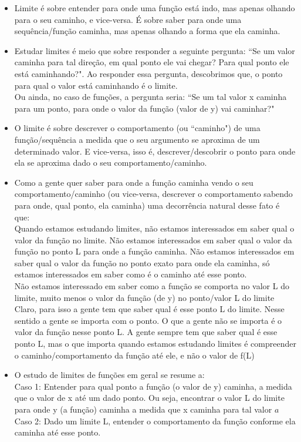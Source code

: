 \documentclass{article}
\begin{document}
\begin{itemize}
    \item Limite é sobre entender para onde uma função está indo, mas apenas olhando para o seu caminho, e vice-versa. É sobre saber para onde uma sequência/função caminha, mas apenas olhando a forma que ela caminha.

    \item Estudar limites é meio que sobre responder a seguinte pergunta: ``Se um valor caminha para tal direção, em qual ponto ele vai chegar? Para qual ponto ele está caminhando?". Ao responder essa pergunta, descobrimos que, o ponto para qual o valor está caminhando é o limite.
    \\[2pt]
    Ou ainda, no caso de funções, a pergunta seria: ``Se um tal valor x caminha para um ponto,  para onde o valor da função (valor de y) vai caminhar?"

    \item O limite é sobre descrever o comportamento (ou ``caminho") de uma função/sequência a medida que o seu argumento se aproxima de um determinado valor. E vice-versa, isso é, descrever/descobrir o ponto para onde ela se aproxima dado o seu comportamento/caminho.

    \item Como a gente quer saber para onde a função caminha vendo o seu comportamento/caminho (ou vice-versa, descrever o comportamento sabendo para onde, qual ponto, ela caminha) uma decorrência natural desse fato é que: 
    \\[2pt]
    Quando estamos estudando limites, não estamos interessados em saber qual o valor da função no limite. Não estamos interessados em saber qual o valor da função no ponto L para onde a função caminha. Não estamos interessados em saber qual o valor da função no ponto exato para onde ela caminha, só estamos interessados em saber como é o caminho até esse ponto.
    \\[2pt]
    Não estamos interessado em saber como a função se comporta no valor L do limite, muito menos o valor da função (de y) no ponto/valor L do limite
    \\[2pt]
    Claro, para isso a gente tem que saber qual é esse ponto L do limite. Nesse sentido a gente se importa com o ponto. O que a gente não se importa é o valor da função nesse ponto L. A gente sempre tem que saber qual é esse ponto L, mas o que importa quando estamos estudando limites é compreender o caminho/comportamento da função até ele, e não o valor de f(L)

    \item O estudo de limites de funções em geral se resume a: 
    \\[2pt]
    Caso 1: Entender para qual ponto a função (o valor de y) caminha, a medida que o valor de x até um dado ponto. Ou seja, encontrar o valor L do limite para onde y (a função) caminha a medida que x caminha para tal valor $a$
    \\[2pt]
    Caso 2: Dado um limite L, entender o comportamento da função conforme ela caminha até esse ponto.
\end{itemize}
\end{document}
